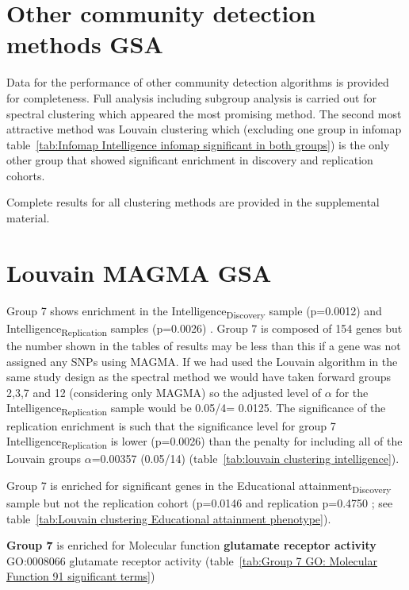 \section{Other community detection methods GSA}


Data for the performance of other community detection algorithms is provided for completeness. Full analysis including subgroup analysis is carried out for spectral clustering which appeared the most promising method. The second most attractive method was Louvain clustering which (excluding one group in infomap table~\ref{tab:Infomap Intelligence infomap significant in both groups}) is the only other group that showed significant enrichment in discovery and replication cohorts. 

Complete results for all clustering methods are provided in the supplemental material. 

\section{Louvain MAGMA GSA}
\label{sec: Louvain GSA}
Group 7 shows enrichment in the Intelligence\textsubscript{Discovery} sample (p=0.0012) and Intelligence\textsubscript{Replication} samples (p=0.0026) . Group 7 is composed of 154 genes but the number shown in the tables of results may be less than this if a gene was not assigned any SNPs using MAGMA. If we had used the Louvain algorithm in the same study design as the spectral method we would have taken forward groups 2,3,7 and 12 (considering only MAGMA) so the adjusted level of $\alpha$ for the Intelligence\textsubscript{Replication} sample would be 0.05/4= 0.0125. The significance of the replication enrichment is such that the significance level for group 7 Intelligence\textsubscript{Replication} is lower (p=0.0026) than the penalty for including all of the Louvain groups $\alpha$=0.00357 (0.05/14) (table~\ref{tab:louvain clustering intelligence}).

Group 7 is enriched for significant genes in the Educational attainment\textsubscript{Discovery} sample but not the replication cohort (p=0.0146 and replication p=0.4750 ; see table~\ref{tab:Louvain clustering Educational attainment phenotype}).




\textbf{Group 7} is enriched for Molecular function \textbf{glutamate receptor activity} GO:0008066 	glutamate receptor activity (table~\ref{tab:Group 7 GO: Molecular Function 91 significant terms})






